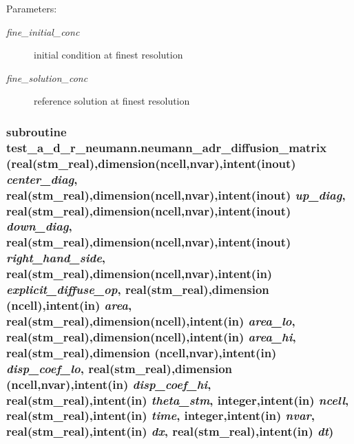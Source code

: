 \begin{Desc}
\item[Parameters:]
\begin{description}
\item[{\em fine\_\-initial\_\-conc}]initial condition at finest resolution\item[{\em fine\_\-solution\_\-conc}]reference solution at finest resolution \end{description}
\end{Desc}
\hypertarget{a00073_63a873ba17146675e814ba8aa96747d5}{
\subsubsection[{neumann\_\-adr\_\-diffusion\_\-matrix}]{\setlength{\rightskip}{0pt plus 5cm}subroutine test\_\-a\_\-d\_\-r\_\-neumann.neumann\_\-adr\_\-diffusion\_\-matrix (real(stm\_\-real),dimension(ncell,nvar),intent(inout) {\em center\_\-diag}, \/  real(stm\_\-real),dimension(ncell,nvar),intent(inout) {\em up\_\-diag}, \/  real(stm\_\-real),dimension(ncell,nvar),intent(inout) {\em down\_\-diag}, \/  real(stm\_\-real),dimension(ncell,nvar),intent(inout) {\em right\_\-hand\_\-side}, \/  real(stm\_\-real),dimension(ncell,nvar),intent(in) {\em explicit\_\-diffuse\_\-op}, \/  real(stm\_\-real),dimension (ncell),intent(in) {\em area}, \/  real(stm\_\-real),dimension(ncell),intent(in) {\em area\_\-lo}, \/  real(stm\_\-real),dimension(ncell),intent(in) {\em area\_\-hi}, \/  real(stm\_\-real),dimension (ncell,nvar),intent(in) {\em disp\_\-coef\_\-lo}, \/  real(stm\_\-real),dimension (ncell,nvar),intent(in) {\em disp\_\-coef\_\-hi}, \/  real(stm\_\-real),intent(in) {\em theta\_\-stm}, \/  integer,intent(in) {\em ncell}, \/  real(stm\_\-real),intent(in) {\em time}, \/  integer,intent(in) {\em nvar}, \/  real(stm\_\-real),intent(in) {\em dx}, \/  real(stm\_\-real),intent(in) {\em dt})}}
\label{a00073_63a873ba17146675e814ba8aa96747d5}



